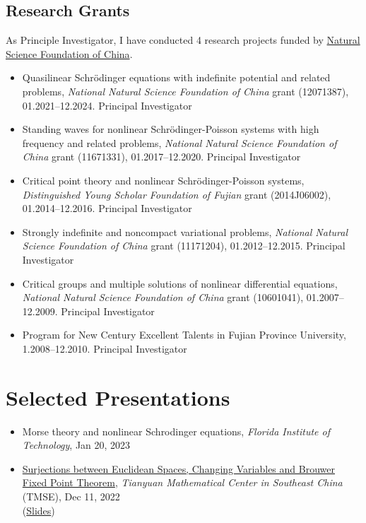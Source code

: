 \documentclass[12pt]{amsproc}
\begin{document}
\subsection{Research Grants}

As Principle Investigator, I have conducted 4 research projects funded by \href{https://www.nsfc.gov.cn}{Natural Science Foundation of China}.
\begin{itemize}
\item Quasilinear Schr\"{o}dinger equations with indefinite potential and
related problems, \emph{National Natural Science Foundation of China} grant
(12071387), 01.2021--12.2024. Principal Investigator

\item Standing waves for nonlinear Schr\"{o}dinger-Poisson systems with high
frequency and related problems, \emph{National Natural Science Foundation of China} grant
(11671331), 01.2017--12.2020. Principal Investigator
\item Critical point theory and nonlinear Schr\"{o}dinger-Poisson systems, \emph{Distinguished Young Scholar Foundation of Fujian} grant (2014J06002), 01.2014--12.2016. Principal Investigator

\item Strongly indefinite and noncompact variational problems, \emph{National Natural Science Foundation of China} grant
(11171204), 01.2012--12.2015. Principal Investigator

\item Critical groups and multiple solutions of nonlinear differential
equations, \emph{National Natural Science Foundation of China} grant
(10601041), 01.2007--12.2009. Principal Investigator
\item Program for New Century Excellent Talents in Fujian Province
University, 1.2008--12.2010. Principal Investigator
\end{itemize}

\section{Selected Presentations}

\begin{itemize}
\item Morse theory and nonlinear Schrodinger equations, \emph{Florida Institute of Technology}, Jan 20, 2023
\item \href{http://tianyuan.xmu.edu.cn/cn/letures/1010.html}{Surjections between Euclidean Spaces, Changing Variables and Brouwer Fixed Point Theorem}, \emph{Tianyuan Mathematical Center in Southeast China} (TMSE), Dec 11, 2022\\
(\href{https://lausb.github.io/math/tmse.pdf}{Slides})
 
\end{itemize}
\end{document}
